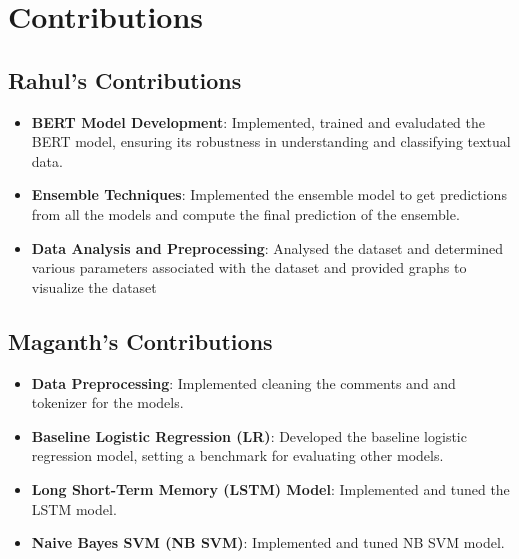 \section{Contributions}

\subsection{Rahul's Contributions}

\begin{itemize}
\item \textbf{BERT Model Development}: Implemented, trained and evaludated the BERT model, ensuring its robustness in understanding and classifying textual data.
\item \textbf{Ensemble Techniques}: Implemented the ensemble model to get predictions from all the models and compute the final prediction of the ensemble.
\item \textbf{Data Analysis and Preprocessing}: Analysed the dataset and determined various parameters associated with the dataset and provided graphs to visualize the dataset
\end{itemize}

\subsection{Maganth's Contributions}

\begin{itemize}
\item \textbf{Data Preprocessing}: Implemented cleaning the comments and  and tokenizer for the models.
\item \textbf{Baseline Logistic Regression (LR)}: Developed the baseline logistic regression model, setting a benchmark for evaluating other models.
\item \textbf{Long Short-Term Memory (LSTM) Model}: Implemented and tuned the LSTM model.
\item \textbf{Naive Bayes SVM (NB SVM)}: Implemented and tuned NB SVM model.
\end{itemize}